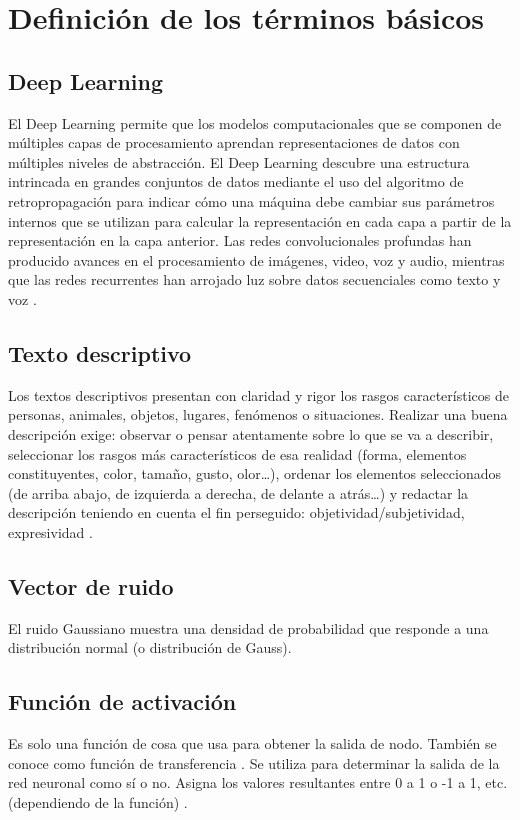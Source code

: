 \chapter{Definición de los términos básicos}

\section{Deep Learning}
El Deep Learning permite que los modelos computacionales que se componen de múltiples capas de procesamiento aprendan representaciones de datos con múltiples niveles de abstracción. El Deep Learning descubre una estructura intrincada en grandes conjuntos de datos mediante el uso del algoritmo de retropropagación para indicar cómo una máquina debe cambiar sus parámetros internos que se utilizan para calcular la representación en cada capa a partir de la representación en la capa anterior. Las redes convolucionales profundas han producido avances en el procesamiento de imágenes, video, voz y audio, mientras que las redes recurrentes han arrojado luz sobre datos secuenciales como texto y voz \cite{lecun-author-2015}.
\section{Texto descriptivo}
Los textos descriptivos presentan con claridad y rigor
los rasgos característicos de personas, animales, objetos, lugares, fenómenos o situaciones. Realizar una
buena descripción exige: observar o pensar atentamente sobre lo que se va a describir, seleccionar los
rasgos más característicos de esa realidad (forma, elementos constituyentes, color, tamaño, gusto, olor…),
ordenar los elementos seleccionados (de arriba abajo,
de izquierda a derecha, de delante a atrás…) y redactar la descripción teniendo en cuenta el fin perseguido: objetividad/subjetividad, expresividad \cite{unknown-author-2015B}.
\section{Vector de ruido}
El ruido Gaussiano muestra una densidad de probabilidad que responde a una distribución normal (o distribución de Gauss).
\section{Función de activación}
Es solo una función de cosa que usa para obtener la salida de nodo. También se conoce como función de transferencia .
Se utiliza para determinar la salida de la red neuronal como sí o no. Asigna los valores resultantes entre 0 a 1 o -1 a 1, etc. (dependiendo de la función) \cite{unknown-author-2019}.
